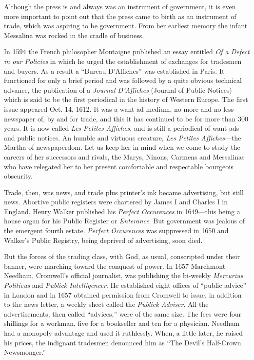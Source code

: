 \documentclass[openany,nobib]{tufte-book}
\begin{document}
Although the press is and always was an instrument of government, it is
even more important to point out that the press came to birth as an
instrument of trade, which was aspiring to be government. From her
earliest memory the infant Messalina was rocked in the cradle of
business.

In 1594 the French philosopher Montaigne published an essay entitled
\emph{Of a Defect in our Policies} in which he urged the establishment
of exchanges for tradesmen and buyers. As a result a ``Bureau
D'Affiches'' was established in Paris. It functioned for only a brief
period and was followed by a quite obvious technical advance, the
publication of a \emph{Journal D'Affiches} (Journal of Public Notices)
which is said to be the first periodical in the history of Western
Europe. The first issue appeared Oct. 14, 1612. It was a want-ad medium,
no more and no less---newspaper of, by and for trade, and this it has
continued to be for more than 300 years. It is now called \emph{Les
Petites Affiches}, and is still a periodical of want-ads and public
notices. An humble and virtuous creature, \emph{Les Petites
Affiches}---the Martha of newspaperdom. Let us keep her in mind when we
come to study the careers of her successors and rivals, the Marys,
Ninons, Carmens and Messalinas who have relegated her to her present
comfortable and respectable bourgeois obscurity.

Trade, then, was news, and trade plus printer's ink became advertising,
but still news. Abortive public registers were chartered by James I and
Charles I in England. Henry Walker published his \emph{Perfect
Occurences} in 1649---this being a house organ for his Public Register
or \emph{Enterance}. But government was jealous of the emergent fourth
estate. \emph{Perfect Occurences} was suppressed in 1650 and Walker's
Public Registry, being deprived of advertising, soon died.

But the forces of the trading class, with God, as usual, conscripted
under their banner, were marching toward the conquest of power. In 1657
Marchmont Needham, Cromwell's official journalist, was publishing the
bi-weekly \emph{Mercurius Politicus} and \emph{Publick Intelligencer}.
He established eight offices of ``public advice'' in London and in 1657
obtained permission from Cromwell to issue, in addition to the news
letter, a weekly sheet called the \emph{Publick Adviser}. All the
advertisements, then called ``advices,'' were of the same size. The fees
were four shillings for a workman, five for a bookseller and ten for a
physician. Needham had a monopoly advantage and used it ruthlessly.
When, a little later, he raised his prices, the indignant tradesmen
denounced him as ``The Devil's Half-Crown Newsmonger.''
\end{document}
